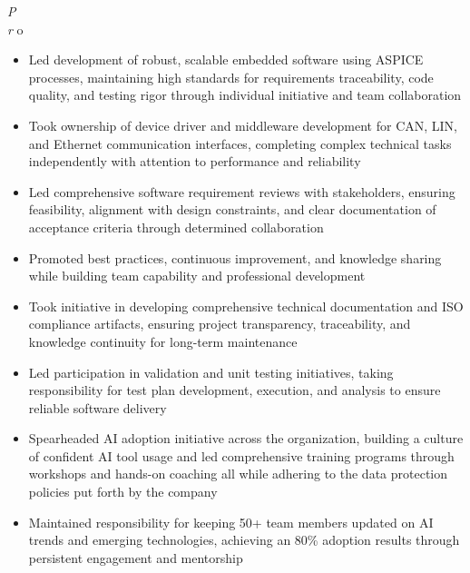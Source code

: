 \documentclass[11pt,letterpaper]{article}
\newcommand{\RoleHeading}[4]{%
  {\bfseries#1} \hfill {\itshape#2}\\
  {\itshape#3} \hfill #4
}
\newenvironment{jobenvironment}[4]{%
  \needspace{2cm}
  \vspace{0.15cm}
  \RoleHeading{#1}{#2}{#3}{#4}
  \vspace{0.05cm}
  \begin{itemize}[leftmargin=0.2in, itemsep=0.05cm, parsep=0cm]
}{%
  \end{itemize}
}
\begin{document}
\begin{jobenvironment}
  \item Proactively engaged with clients to troubleshoot technical issues and review software requirements, building strong relationships and ensuring project success through persistent problem-solving
  \item Led development of robust, scalable embedded software using ASPICE processes, maintaining high standards for requirements traceability, code quality, and testing rigor through individual initiative and team collaboration
  \item Took ownership of device driver and middleware development for CAN, LIN, and Ethernet communication interfaces, completing complex technical tasks independently with attention to performance and reliability
  \item Led comprehensive software requirement reviews with stakeholders, ensuring feasibility, alignment with design constraints, and clear documentation of acceptance criteria through determined collaboration
  \item Promoted best practices, continuous improvement, and knowledge sharing while building team capability and professional development
  \item Took initiative in developing comprehensive technical documentation and ISO compliance artifacts, ensuring project transparency, traceability, and knowledge continuity for long-term maintenance
  \item Led participation in validation and unit testing initiatives, taking responsibility for test plan development, execution, and analysis to ensure reliable software delivery
  \item Spearheaded AI adoption initiative across the organization, building a culture of confident AI tool usage and led comprehensive training programs through workshops and hands-on coaching all while adhering to the data protection policies put forth by the company
  \item Maintained responsibility for keeping 50+ team members updated on AI trends and emerging technologies, achieving an 80\% adoption results through persistent engagement and mentorship
\end{jobenvironment}
\end{document}
